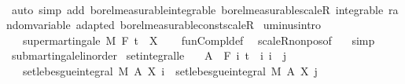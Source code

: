 \begin{isabellebody}
\ \ \isacommand{{\isacharbraceright}{\kern0pt}}\isamarkupfalse%
\isanewline
{}\isamarkupfalse%
\ {\isacharparenleft}{\kern0pt}auto\ simp\ add{\isacharcolon}{\kern0pt}\ borel{\isacharunderscore}{\kern0pt}measurable{\isacharunderscore}{\kern0pt}integrable\ borel{\isacharunderscore}{\kern0pt}measurable{\isacharunderscore}{\kern0pt}scaleR\ integrable\ random{\isacharunderscore}{\kern0pt}variable\ adapted\ borel{\isacharunderscore}{\kern0pt}measurable{\isacharunderscore}{\kern0pt}const{\isacharunderscore}{\kern0pt}scaleR{\isacharparenright}{\kern0pt}%
\endisatagproof
{\isafoldproof}%
%
\isadelimproof
\isanewline
%
\endisadelimproof
\isanewline
{}\isamarkupfalse%
\ uminus{\isacharbrackleft}{\kern0pt}intro{\isacharbrackright}{\kern0pt}{\isacharcolon}{\kern0pt}\isanewline
\ \ \ {\isachardoublequoteopen}supermartingale\ M\ F\ t\ {\isacharparenleft}{\kern0pt}{\isacharminus}{\kern0pt}\ X{\isacharparenright}{\kern0pt}{\isachardoublequoteclose}\isanewline
%
\isadelimproof
\ \ %
\endisadelimproof
%
\isatagproof
{}\isamarkupfalse%
\ fun{\isacharunderscore}{\kern0pt}Compl{\isacharunderscore}{\kern0pt}def\ \isamarkupfalse%
\ scaleR{\isacharunderscore}{\kern0pt}nonpos{\isacharbrackleft}{\kern0pt}of\ {\isachardoublequoteopen}{\isacharminus}{\kern0pt}{}{\isachardoublequoteclose}{\isacharbrackright}{\kern0pt}\ \isamarkupfalse%
\ simp%
\endisatagproof
{\isafoldproof}%
%
\isadelimproof
\isanewline
%
\endisadelimproof
\isanewline
{}\isamarkupfalse%
\isanewline
\isanewline
{}\isamarkupfalse%
\ submartingale{\isacharunderscore}{\kern0pt}linorder\isanewline
{}\isanewline
\isanewline
{}\isamarkupfalse%
\ set{\isacharunderscore}{\kern0pt}integral{\isacharunderscore}{\kern0pt}le{\isacharcolon}{\kern0pt}\isanewline
\ \ \ {\isachardoublequoteopen}A\ {\isasymin}\ F\ i{\isachardoublequoteclose}\ {\isachardoublequoteopen}t\ {\isasymle}\ i{\isachardoublequoteclose}\ {\isachardoublequoteopen}i\ {\isasymle}\ j{\isachardoublequoteclose}\isanewline
\ \ \ {\isachardoublequoteopen}set{\isacharunderscore}{\kern0pt}lebesgue{\isacharunderscore}{\kern0pt}integral\ M\ A\ {\isacharparenleft}{\kern0pt}X\ i{\isacharparenright}{\kern0pt}\ {\isasymle}\ set{\isacharunderscore}{\kern0pt}lebesgue{\isacharunderscore}{\kern0pt}integral\ M\ A\ {\isacharparenleft}{\kern0pt}X\ j{\isacharparenright}{\kern0pt}{\isachardoublequoteclose}\ \ \isanewline
%

\end{isabellebody}
